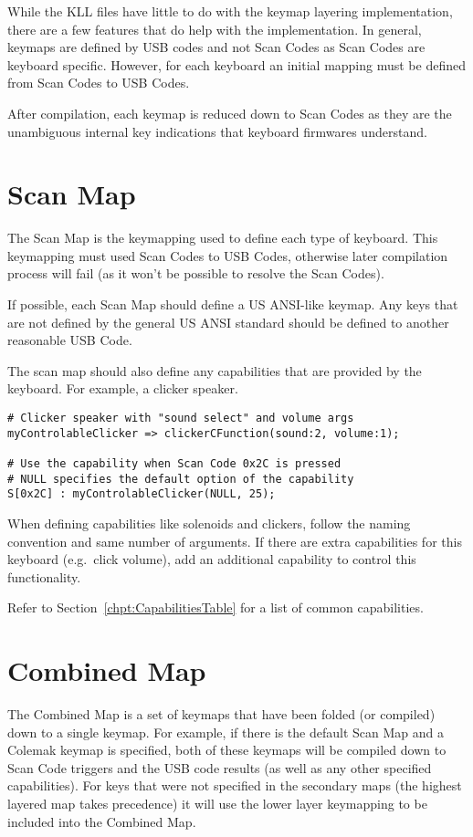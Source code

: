 \documentclass{kiibohd-template}
\begin{document}
While the KLL files have little to do with the keymap layering implementation, there are a few features that do help with the implementation.
In general, keymaps are defined by USB codes and not Scan Codes as Scan Codes are keyboard specific.
However, for each keyboard an initial mapping must be defined from Scan Codes to USB Codes.

After compilation, each keymap is reduced down to Scan Codes as they are the unambiguous internal key indications that keyboard firmwares understand.


\section{Scan Map}

The Scan Map is the keymapping used to define each type of keyboard.
This keymapping must used Scan Codes to USB Codes, otherwise later compilation process will fail (as it won't be possible to resolve the Scan Codes).

If possible, each Scan Map should define a US ANSI-like keymap.
Any keys that are not defined by the general US ANSI standard should be defined to another reasonable USB Code.

The scan map should also define any capabilities that are provided by the keyboard.
For example, a clicker speaker.

\begin{lstlisting}
# Clicker speaker with "sound select" and volume args
myControlableClicker => clickerCFunction(sound:2, volume:1);

# Use the capability when Scan Code 0x2C is pressed
# NULL specifies the default option of the capability
S[0x2C] : myControlableClicker(NULL, 25);
\end{lstlisting}

When defining capabilities like solenoids and clickers, follow the naming convention and same number of arguments.
If there are extra capabilities for this keyboard (e.g.\ click volume), add an additional capability to control this functionality.

Refer to Section~\ref{chpt:CapabilitiesTable} for a list of common capabilities.


\section{Combined Map}

The Combined Map is a set of keymaps that have been folded (or compiled) down to a single keymap.
For example, if there is the default Scan Map and a Colemak keymap is specified, both of these keymaps will be compiled down to Scan Code triggers and the USB code results (as well as any other specified capabilities).
For keys that were not specified in the secondary maps (the highest layered map takes precedence) it will use the lower layer keymapping to be included into the Combined Map.
\end{document}
